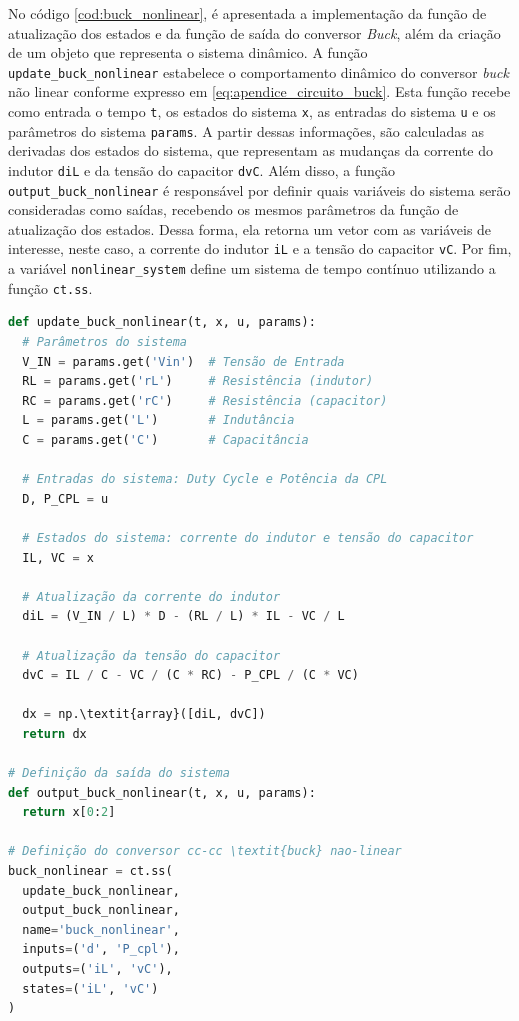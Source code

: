 No código \ref{cod:buck_nonlinear}, é apresentada a implementação da função de atualização dos estados e da função de saída do conversor \textit{Buck}, além da criação de um objeto que representa o sistema dinâmico. A função \texttt{update\_buck\_nonlinear} estabelece o comportamento dinâmico do conversor \textit{buck} não linear conforme expresso em \eqref{eq:apendice_circuito_buck}. Esta função recebe como entrada o tempo \texttt{t}, os estados do sistema \texttt{x}, as entradas do sistema \texttt{u} e os parâmetros do sistema \texttt{params}. A partir dessas informações, são calculadas as derivadas dos estados do sistema, que representam as mudanças da corrente do indutor \texttt{diL} e da tensão do capacitor \texttt{dvC}. Além disso, a função \texttt{output\_buck\_nonlinear} é responsável por definir quais variáveis do sistema serão consideradas como saídas, recebendo os mesmos parâmetros da função de atualização dos estados. Dessa forma, ela retorna um vetor com as variáveis de interesse, neste caso, a corrente do indutor \texttt{iL} e a tensão do capacitor \texttt{vC}. Por fim, a variável \texttt{nonlinear\_system} define um sistema de tempo contínuo utilizando a função \texttt{ct.ss}.

\vspace{8pt}
\begin{lstlisting}[language=Python, caption={Implementação do conversor \textit{Buck} não linear.}, label=cod:buck_nonlinear]
def update_buck_nonlinear(t, x, u, params):
  # Parâmetros do sistema
  V_IN = params.get('Vin')  # Tensão de Entrada
  RL = params.get('rL')     # Resistência (indutor)
  RC = params.get('rC')     # Resistência (capacitor)
  L = params.get('L')       # Indutância
  C = params.get('C')       # Capacitância

  # Entradas do sistema: Duty Cycle e Potência da CPL
  D, P_CPL = u

  # Estados do sistema: corrente do indutor e tensão do capacitor
  IL, VC = x

  # Atualização da corrente do indutor
  diL = (V_IN / L) * D - (RL / L) * IL - VC / L  

  # Atualização da tensão do capacitor   
  dvC = IL / C - VC / (C * RC) - P_CPL / (C * VC)

  dx = np.\textit{array}([diL, dvC])
  return dx

# Definição da saída do sistema
def output_buck_nonlinear(t, x, u, params):
  return x[0:2]

# Definição do conversor cc-cc \textit{buck} nao-linear
buck_nonlinear = ct.ss(
  update_buck_nonlinear, 
  output_buck_nonlinear,
  name='buck_nonlinear',
  inputs=('d', 'P_cpl'),
  outputs=('iL', 'vC'),
  states=('iL', 'vC')
)
\end{lstlisting}

